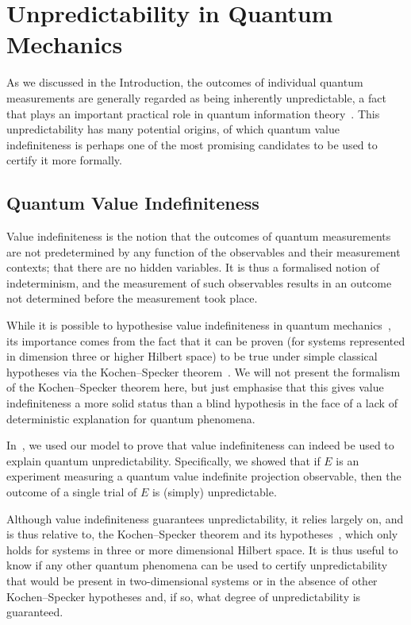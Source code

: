 \documentclass[information,article,accept,moreauthors,pdftex,12pt,a4paper]{mdpi}
\theoremstyle{mdpi}
\newcounter{thm}
\newcounter{ex}
\newcounter{re}
\theoremstyle{mdpidefinition}
\begin{document}
\section{Unpredictability in Quantum Mechanics}

As we discussed in the Introduction, the outcomes of individual quantum measurements are generally regarded as being inherently unpredictable, a fact that plays an important practical role in quantum information theory~\cite{10.1038/nature09008,gisin-qc-rmp}.
This unpredictability has many potential origins, of which quantum value indefiniteness is perhaps one of the most promising candidates to be used to certify it more formally.

\subsection{Quantum Value Indefiniteness}
\label{sec:VI}

Value indefiniteness is the notion that the outcomes of quantum measurements are not predetermined by any function of the observables and their measurement contexts; that there are no hidden variables.
It is thus a formalised notion of indeterminism, and the measurement of such observables results in an outcome not determined before the measurement took place.

While it is possible to hypothesise value indefiniteness in quantum mechanics~\cite{zeil-99}, its importance comes from the fact that it can be proven (for systems represented in dimension three or higher Hilbert space) to be true under simple classical hypotheses via the Kochen--Specker theorem~\cite{kochen1,2012-incomput-proofsCJ,2015-AnalyticKS}.
We will not present the formalism of the Kochen--Specker theorem here, but just emphasise that this gives value indefiniteness a more solid status than a blind hypothesis in the face of a lack of deterministic explanation for quantum phenomena.

In~\cite{DBLP:conf/birthday/AbbottCS15}, we used our model to prove that value indefiniteness can indeed be used to explain quantum unpredictability.
Specifically, we showed that
%
	{if $E$ is an experiment measuring a quantum value indefinite projection observable, then the outcome of a single trial of $E$ is (simply) unpredictable.}

Although value indefiniteness guarantees unpredictability, it relies largely on, and is thus relative to, the Kochen--Specker theorem and its hypotheses~\cite{kochen1,pitowsky:218,2012-incomput-proofsCJ}, which only holds for systems in three or more dimensional Hilbert space.
It is thus useful to know if any other quantum phenomena can be used to certify unpredictability that would be present in two-dimensional systems or in the absence of other Kochen--Specker hypotheses and, if so, what degree of unpredictability is guaranteed.
\end{document}
